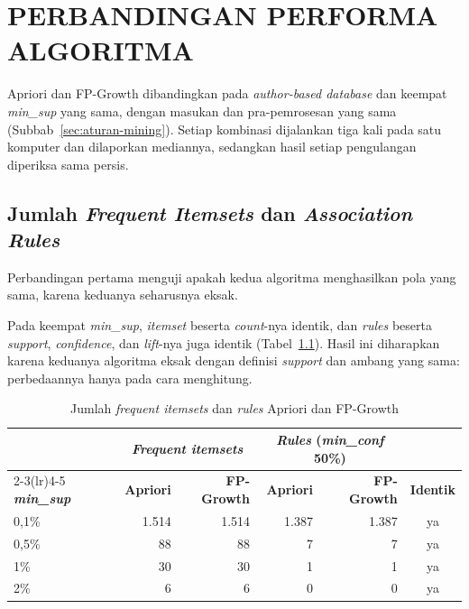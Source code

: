 \chapter{PERBANDINGAN PERFORMA ALGORITMA}
\label{chap:performa}\label{sec:hasil-t6}

Apriori dan FP-Growth dibandingkan pada \textit{author-based database} dan keempat \textit{min\_sup} yang sama, dengan masukan dan pra-pemrosesan yang sama (Subbab~\ref{sec:aturan-mining}). Setiap kombinasi dijalankan tiga kali pada satu komputer dan dilaporkan mediannya, sedangkan hasil setiap pengulangan diperiksa sama persis.

\section{Jumlah \textit{Frequent Itemsets} dan \textit{Association Rules}}
\label{sec:hasil-t6-jumlah}
Perbandingan pertama menguji apakah kedua algoritma menghasilkan pola yang sama, karena keduanya seharusnya eksak.

Pada keempat \textit{min\_sup}, \textit{itemset} beserta \textit{count}-nya identik, dan \textit{rules} beserta \textit{support}, \textit{confidence}, dan \textit{lift}-nya juga identik (Tabel~\ref{tab:t6-jumlah}). Hasil ini diharapkan karena keduanya algoritma eksak dengan definisi \textit{support} dan ambang yang sama: perbedaannya hanya pada cara menghitung.

\begin{table}[!htb]
\caption{Jumlah \textit{frequent itemsets} dan \textit{rules} Apriori dan FP-Growth}
\label{tab:t6-jumlah}
\small
\begin{tabular*}{\textwidth}{@{\extracolsep{\fill}}@{}lrrrrc@{}}
\toprule
 & \multicolumn{2}{c}{\textbf{\textit{Frequent itemsets}}} & \multicolumn{2}{c}{\textbf{\textit{Rules} (\textit{min\_conf} 50\%)}} & \\
\cmidrule(lr){2-3}\cmidrule(lr){4-5}
\textbf{\textit{min\_sup}} & \textbf{Apriori} & \textbf{FP-Growth} & \textbf{Apriori} & \textbf{FP-Growth} & \textbf{Identik} \\
\midrule
0,1\% & 1.514 & 1.514 & 1.387 & 1.387 & ya \\
0,5\% & 88 & 88 & 7 & 7 & ya \\
1\% & 30 & 30 & 1 & 1 & ya \\
2\% & 6 & 6 & 0 & 0 & ya \\
\bottomrule
\end{tabular*}
\end{table}

